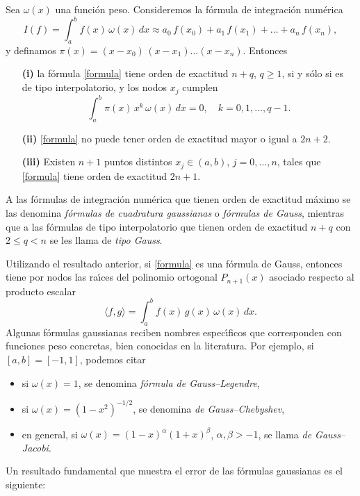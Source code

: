 \begin{thm}
Sea $\omega(x)$ una funci\'on peso. Consideremos la f\'ormula de integraci\'on num\'erica
\begin{equation} \label{formula}
  I(f) = \int_a^b\!\! f(x)\,\omega(x)\,dx \approx a_0 \,f(x_0) + a_1\,f(x_1) + \ldots + a_n \,f(x_n),
\end{equation}
y definamos  $\pi(x)=(x-x_0)\,(x-x_1)\ldots(x-x_n)$. Entonces
\begin{itemize}
\item[\bf (i)] la f\'ormula \eqref{formula} tiene orden de exactitud $n+q$, $q\ge 1$, si y s\'olo si es de tipo interpolatorio, y los nodos $x_j$ cumplen
      $$
       \int_a^b\!\! \pi(x)\,x^k\,\omega(x)\,dx = 0,\quad k=0,1,\ldots,q-1.
      $$
\item[\bf (ii)] \eqref{formula} no puede tener orden de exactitud mayor o igual a $2n+2$.
\item[\bf (iii)] Existen $n+1$ puntos distintos $x_j \in (a,b)$, $j=0,\ldots,n$, tales que \eqref{formula} tiene orden de exactitud $2n+1$.
\end{itemize}
\end{thm}
A las f\'ormulas de integraci\'on num\'erica que tienen orden de exactitud m\'aximo se las denomina
{\it f\'ormulas de cuadratura gaussianas} o {\it f\'ormulas de Gauss}, mientras que a las f\'ormulas de tipo interpolatorio que tienen orden de exactitud $n+q$ con $2\le q<n$ se les llama de {\it tipo Gauss}.

Utilizando el resultado anterior, si \eqref{formula} es una f\'ormula de Gauss, entonces tiene por nodos
las ra\'\i ces del polinomio ortogonal $P_{n+1}(x)$ asociado respecto al producto
escalar
$$
 \langle f,g \rangle = \int_a^b\!\! f(x)\,g(x)\,\omega(x)\,dx.
$$
Algunas f\'ormulas gaussianas reciben nombres espec\'\i ficos que corresponden
con funciones peso concretas, bien conocidas en la literatura. Por ejemplo, si $[a,b]=[-1,1]$, podemos citar
\begin{itemize}
\item si $\omega(x) = 1$, se denomina {\it f\'ormula de Gauss--Legendre},
\item si $\omega(x) = (1-x^2)^{-1/2}$, se denomina {\it de Gauss--Chebyshev}, 
\item en general, si $\omega(x) = (1-x)^\alpha(1+x)^\beta$, $\alpha, \beta >-1$, se llama {\it de Gauss--Jacobi}.
\end{itemize}
Un resultado fundamental que muestra el error de las f\'ormulas
gaus\-sia\-nas es el si\-guien\-te:


